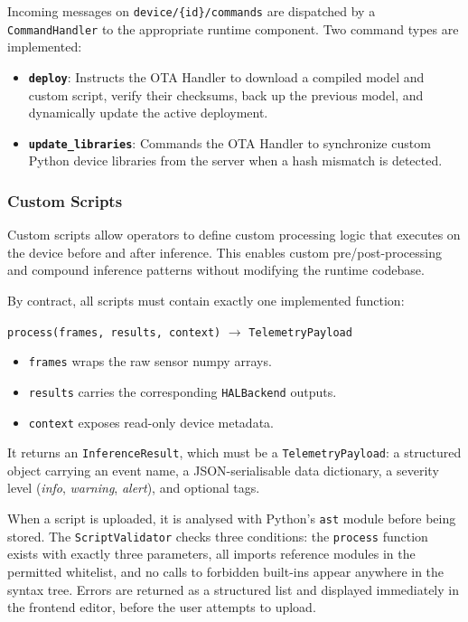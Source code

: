 Incoming messages on \texttt{device/\{id\}/commands} are dispatched by a \texttt{CommandHandler} to the appropriate runtime component. Two command types are implemented:
\begin{itemize}
    \item \textbf{\texttt{deploy}}: Instructs the \gls{OTA} Handler to download a compiled model and custom script, verify their checksums, back up the previous model, and dynamically update the active deployment.
    \item \textbf{\texttt{update\_libraries}}: Commands the \gls{OTA} Handler to synchronize custom Python device libraries from the server when a hash mismatch is detected.
\end{itemize}

\subsubsection{Custom Scripts}\label{sec:impl:scripts}

Custom scripts allow operators to define custom processing logic that executes on the device before and after inference. This enables custom pre/post-processing and compound inference patterns without modifying the runtime codebase.

By contract, all scripts must contain exactly one implemented function:

\begin{center}
    \texttt{process(frames, results, context)} $\rightarrow$ \texttt{TelemetryPayload}
\end{center}

\begin{itemize}
    \item \texttt{frames} wraps the raw sensor numpy arrays.
    \item \texttt{results} carries the corresponding \texttt{HALBackend} outputs.
    \item \texttt{context} exposes read-only device metadata.
\end{itemize}

It returns an \texttt{InferenceResult}, which must be a \texttt{TelemetryPayload}: a structured object carrying an event name, a \gls{JSON}-serialisable data dictionary, a severity level (\textit{info}, \textit{warning}, \textit{alert}), and optional tags.

When a script is uploaded, it is analysed with Python's \texttt{ast} module before being stored. The \texttt{ScriptValidator} checks three conditions: the \texttt{process} function exists with exactly three parameters, all imports reference modules in the permitted whitelist, and no calls to forbidden built-ins appear anywhere in the syntax tree. Errors are returned as a structured list and displayed immediately in the frontend editor, before the user attempts to upload.

